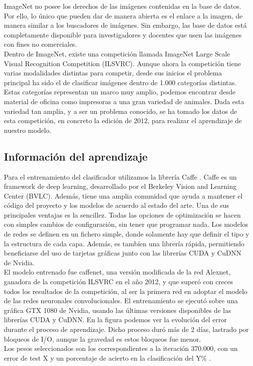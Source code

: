 ImageNet no posee los derechos de las imágenes contenidas en la base de datos. Por ello, lo único que pueden dar de manera abierta es el enlace a la imagen, de manera similar a los buscadores de imágenes. Sin embargo, las base de datos está completamente disponible para investigadores y docentes que usen las imágenes con fines no comerciales.\\

Dentro de ImageNet, existe una competición llamada ImageNet Large Scale Visual Recognition Competition (ILSVRC). Aunque ahora la competición tiene varias modalidades distintas para competir, desde sus inicios el problema principal ha sido el de clasificar imágenes dentro de 1.000 categorías distintas. Estas categorías representan un marco muy amplio, podemos encontrar desde material de oficina como impresoras a una gran variedad de animales. Dada esta variedad tan amplia, y a ser un problema conocido, se ha tomado los datos de esta competición, en concreto la edición de 2012, para realizar el aprendizaje de nuestro modelo.\\

\subsection{Información del aprendizaje}

Para el entrenamiento del clasificador utilizamos la librería Caffe \cite{jia2014caffe}. Caffe es un framework de deep learning, desarrollado por el  Berkeley Vision and Learning Center (BVLC). Además, tiene una amplia comunidad que ayuda a mantener el código del proyecto y los modelos de acuerdo al estado del arte. Una de sus principales ventajas es la sencillez. Todas las opciones de optimización se hacen con simples cambios de configuración, sin tener que programar nada. Los modelos de redes se definen en un fichero simple, donde solamente hay que definir el tipo y la estructura de cada capa. Además, es tambíen una librería rápida, permitiendo beneficiarse del uso de tarjetas gráficas junto con las librerías CUDA y CuDNN de Nvidia.\\

El modelo entrenado fue caffenet, una versión modificada de la red Alexnet, ganadora de la competición ILSVRC en el año 2012, y que superó con creces todos los resultados de la competición, al ser la primera red en adoptar el modelo de las redes neuronales convolucionales. El entrenamiento se ejecutó sobre una gráfica GTX 1080 de Nvidia, usando las últimas versiones disponibles de las librerías CUDA y CuDNN. En la figura  podemos ver la evolución del error durante el proceso de aprendizaje. Dicho proceso duró más de 2 días, lastrado por bloqueos de I/O, aunque la gravedad es estos bloqueos fue menor.\\
 
Los pesos seleccionados son los correspondientes a la iteración 370.000, con un error de test X y un porcentaje de acierto en la clasificación del Y\% .
